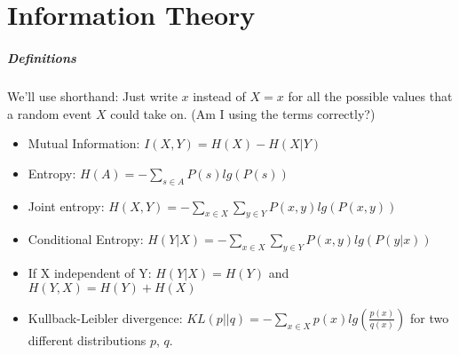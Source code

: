 \documentclass[titlepage,11pt]{article}
\begin{document}
\section{Information Theory}
\subparagraph{Definitions}
We'll use shorthand: Just write $x$ instead of $X= x$ for all the possible values that a random event $X$ could take on. (Am I using the terms correctly?)
\begin{itemize}
\item Mutual Information: $I(X,Y) = H(X) - H(X|Y)$
\item Entropy: $H(A) = - \sum_{s \in A} P(s) lg(P(s))$
\item Joint entropy: $H(X, Y) = - \sum_{x \in X} \sum_{y \in Y} P(x,y) lg(P(x,y))$
\item Conditional Entropy: $H(Y|X) = -\sum_{x \in X} \sum_{y \in Y} P(x,y) lg(P(y|x))$
\item If X independent of Y: $H(Y|X) = H(Y)$ and $H(Y,X) = H(Y) +H(X)$
\item Kullback-Leibler divergence: $KL(p||q) = - \sum_{x \in X} p(x) lg(\frac{p(x)}{q(x)})$ for two different distributions $p$, $q$.
\end{itemize}
\end{document}
